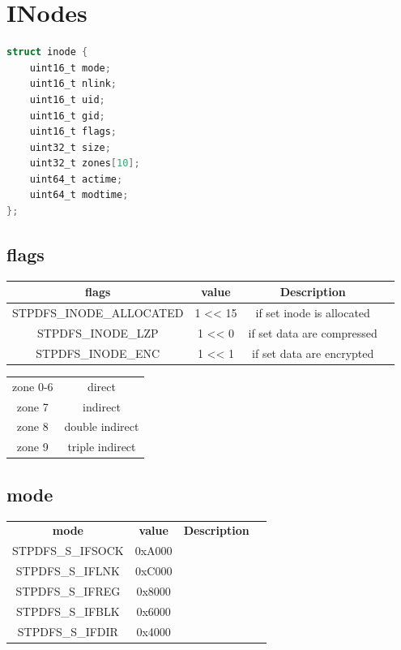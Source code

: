 \documentclass[a4paper, 12pt, openright, english]{scrbook}
\begin{document}
	\section{INodes}

	\begin{lstlisting}[language=C]
struct inode {
	uint16_t mode;
	uint16_t nlink;
	uint16_t uid;
	uint16_t gid;
	uint16_t flags;
	uint32_t size;
	uint32_t zones[10];
	uint64_t actime;
	uint64_t modtime;
};
	\end{lstlisting}
	
	\subsection{flags}

	\begin{center}
		\begin{tabular}{ |c|c|c|c| } 
 			\hline
	 		\textbf{flags} & \textbf{value} & \textbf{Description}  \\ 
			\hline
			STPDFS\_INODE\_ALLOCATED & 1 << 15 & if set inode is allocated \\
			STPDFS\_INODE\_LZP & 1 << 0 & if set data are compressed \\
			STPDFS\_INODE\_ENC &  1 << 1 & if set data are encrypted \\
 		\hline
		\end{tabular}
	\end{center}

	\begin{center}
		\begin{tabular}{ |c|c| }
			zone 0-6 & direct \\
			zone 7 & indirect \\
			zone 8 & double indirect \\
			zone 9 & triple indirect \\
		\end{tabular}
	\end{center}

	\subsection{mode}

	\begin{center}
		\begin{tabular}{ |c|c|c|c| } 
 			\hline
 			\textbf{mode} & \textbf{value} & \textbf{Description}  \\ 
			STPDFS\_S\_IFSOCK & 0xA000 & \\
			STPDFS\_S\_IFLNK  & 0xC000 & \\
			STPDFS\_S\_IFREG & 0x8000 & \\
			STPDFS\_S\_IFBLK  & 0x6000 & \\
			STPDFS\_S\_IFDIR &  0x4000 & \\
 			\hline
		\end{tabular}
	\end{center}

	\appendix
\end{document}
